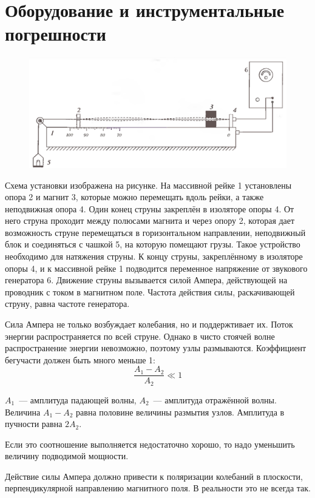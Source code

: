 \section{Оборудование и инструментальные погрешности}
\begin{figure}[ht!]
    \centering\includegraphics[width=0.8\linewidth]{img/img1.png}
\end{figure}

Схема установки изображена на рисунке. На массивной рейке 1 установлены опора 2 и магнит 3,
которые можно перемещать вдоль рейки, а также неподвижная опора 4. Один конец струны
закреплён в изоляторе опоры 4. От него струна проходит между полюсами магнита и через
опору 2, которая дает возможность струне перемещаться в горизонтальном направлении,
неподвижный блок и соединяться с чашкой 5, на которую помещают грузы. Такое устройство
необходимо для натяжения струны. К концу струны, закреплённому в изоляторе опоры 4, и к
массивной рейке 1 подводится переменное напряжение от звукового генератора 6. Движение
струны вызывается силой Ампера, действующей на проводник с током в магнитном поле. Частота
действия силы, раскачивающей струну, равна частоте генератора.

Сила Ампера не только возбуждает колебания, но и поддержтивает их.
Поток энергии  распространяется по всей струне. Однако в чисто стоячей волне распространение
энергии невозможно, поэтому узлы размываются. Коэффициент бегучасти должен быть много меньше 1:
\[\frac{A_1-A_2}{A_2}\ll 1\]

$A_1$~--- амплитуда падающей волны, $A_2$~--- амплитуда отражённой волны.
Величина $A_1-A_2$ равна половине величины размытия узлов. Амплитуда в пучности равна $2A_2$.

Если это соотношение выполняется недостаточно хорошо, то надо уменьшить величину подводимой мощности.

Действие силы Ампера должно привести к поляризации колебаний в плоскости, перпендикулярной
направлению магнитного поля. В реальности это не всегда так.
